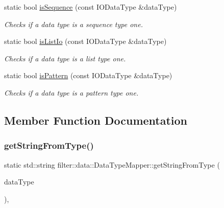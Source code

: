 \begin{DoxyCompactItemize}
static bool \hyperlink{classfilter_1_1data_1_1_data_type_mapper_ad4bf024b99e0a3470b8fa41523e5392c}{is\+Sequence} (const I\+O\+Data\+Type \&data\+Type)
\begin{DoxyCompactList}\small\item\em Checks if a data type is a sequence type one. \end{DoxyCompactList}\item 
static bool \hyperlink{classfilter_1_1data_1_1_data_type_mapper_a60c8bd400abf2405d068dd09851e6717}{is\+List\+Io} (const I\+O\+Data\+Type \&data\+Type)
\begin{DoxyCompactList}\small\item\em Checks if a data type is a list type one. \end{DoxyCompactList}\item 
static bool \hyperlink{classfilter_1_1data_1_1_data_type_mapper_a7ca7334cdd806a1ce9680d198a0287e6}{is\+Pattern} (const I\+O\+Data\+Type \&data\+Type)
\begin{DoxyCompactList}\small\item\em Checks if a data type is a pattern type one. \end{DoxyCompactList}\end{DoxyCompactItemize}


\subsection{Member Function Documentation}
\mbox{\label{classfilter_1_1data_1_1_data_type_mapper_a96e71517bc63d051a539162c26d17fc9}} 
\subsubsection{\texorpdfstring{get\+String\+From\+Type()}{getStringFromType()}}
{\footnotesize\ttfamily static std\+::string filter\+::data\+::\+Data\+Type\+Mapper\+::get\+String\+From\+Type (\begin{DoxyParamCaption}\item[{const I\+O\+Data\+Type \&}]{data\+Type }\end{DoxyParamCaption})\hspace{0.3cm}{\ttfamily [inline]}, {\ttfamily [static]}}


